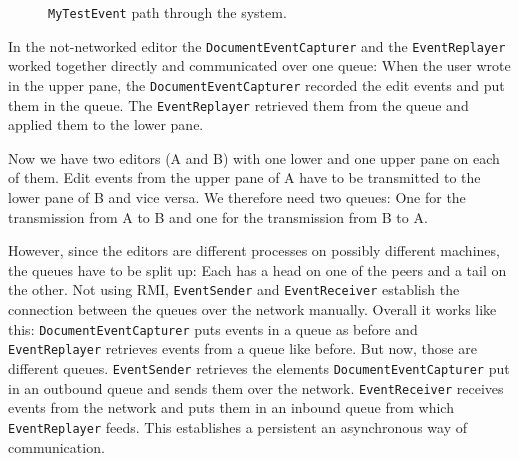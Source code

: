 \documentclass[a4paper,draft,12pt,oneside,article,table]{memoir}
\newcommand{\mil}[1]{\texttt{#1}}
\begin{document}
\begin{figure}[hbp]
  \centering
  \caption{\mil{MyTestEvent} path through the system.}
  \label{fig:event}
\end{figure}
In the not-networked editor the \mil{DocumentEventCapturer} and the
\mil{EventReplayer} worked together directly and communicated over one
queue: When the user wrote in the upper pane, the
\mil{DocumentEventCapturer} recorded the edit events and put them in the
queue. The \mil{EventReplayer} retrieved them from the queue and applied
them to the lower pane.

Now we have two editors (A and B) with one lower and one upper pane on
each of them. Edit events from the upper pane of A have to be
transmitted to the lower pane of B and vice versa. We therefore need two
queues: One for the transmission from A to B and one for the
transmission from B to A.

However, since the editors are different processes on possibly different
machines, the queues have to be split up: Each has a head on one of the
peers and a tail on the other.  Not using RMI, \mil{EventSender} and
\mil{EventReceiver} establish the connection between the queues over the
network manually. Overall it works like this:
\mil{DocumentEventCapturer} puts events in a queue as before and
\mil{EventReplayer} retrieves events from a queue like before. But now,
those are different queues.  \mil{EventSender} retrieves the elements
\mil{DocumentEventCapturer} put in an outbound queue and sends them over
the network.  \mil{EventReceiver} receives events from the network and
puts them in an inbound queue from which \mil{EventReplayer} feeds. This
establishes a persistent an asynchronous way of communication.
\end{document}

